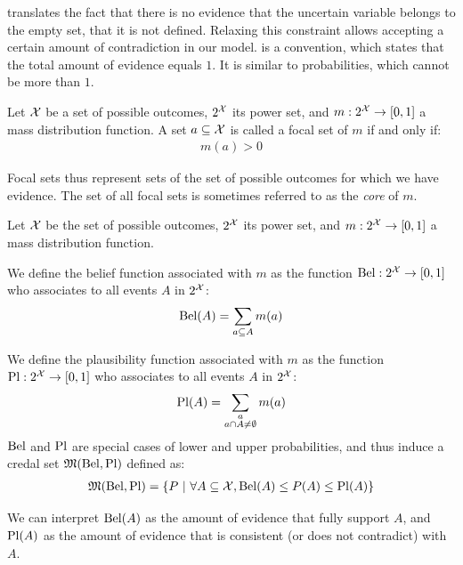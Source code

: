 \begin{remark}
     translates the fact that there is no evidence that the uncertain variable belongs to the empty set, \ie that it is not defined. Relaxing this constraint allows accepting a certain amount of contradiction in our model.
     is a convention, which states that the total amount of evidence equals $1$. It is similar to probabilities, which cannot be more than $1$. 
\end{remark}

\begin{definition}\label{def:focal_set}
    Let $\mathcal{X}$ be a set of possible outcomes, $2^{\mathcal{X}}$ its power set, and $m:2^{\mathcal{X}}\rightarrow[0,1]$ a mass distribution function. A set $a\subseteq\mathcal{X}$ is called a focal set of $m$ if and only if:
    \begin{align}
        m(a)>0\label{eq:focal_set}
    \end{align}
\end{definition}
Focal sets thus represent sets of the set of possible outcomes for which we have evidence. The set of all focal sets is sometimes referred to as the \textit{core} of $m$.

\begin{definition}\label{def:belief_plausibility}
    Let $\mathcal{X}$ be the set of possible outcomes, $2^{\mathcal{X}}$ its power set, and $m:2^{\mathcal{X}}\rightarrow[0,1]$ a mass distribution function.
    
    We define the belief function associated with $m$ as the function $\mathrm{Bel}:2^{\mathcal{X}}\rightarrow[0,1]$ who associates to all events $A$ in $2^{\mathcal{X}}$:
    \begin{align*}
        \mathrm{Bel}(A)=\sum_{a\subseteq A} m(a)
    \end{align*}
    
    We define the plausibility function associated with $m$ as the function $\mathrm{Pl} :2^{\mathcal{X}}\rightarrow[0,1]$ who associates to all events $A$ in $2^{\mathcal{X}}$:
    \begin{align*}
        \mathrm{Pl}(A)=\sum_{\substack{a\\a\cap A\neq\emptyset}} m(a)
    \end{align*}
    $\mathrm{Bel}$ and $\mathrm{Pl}$ are special cases of lower and upper probabilities, and thus induce a credal set $\mathfrak{M}(\mathrm{Bel}, \mathrm{Pl})$ defined as:
    \begin{align*}
        \mathfrak{M}(\mathrm{Bel}, \mathrm{Pl}) =\{P~|~\forall A\subseteq\mathcal{X}, \mathrm{Bel}(A) \leq P(A) \leq \mathrm{Pl}(A) \}
    \end{align*}
\end{definition}
We can interpret $\mathrm{Bel}(A)$ as the amount of evidence that fully support $A$, and $\mathrm{Pl}(A)$ as the amount of evidence that is consistent (or does not contradict) with $A$.

